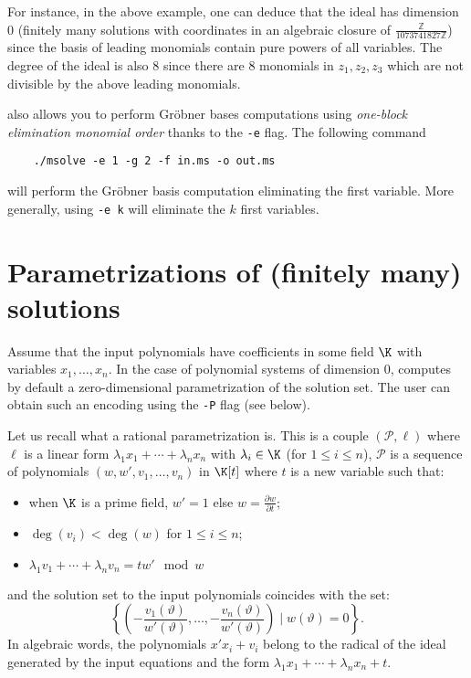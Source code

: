\documentclass[a4paper,english,11pt]{scrartcl}
\theoremstyle{definition}
\theoremstyle{remark}
\def\leq{\leqslant}
\begin{document}
For instance, in the above example, one can deduce that the ideal has dimension
$0$ (finitely many solutions with coordinates in an algebraic closure of
$\frac{\mathbb{Z}}{1073741827\mathbb{Z}}$) since the basis of leading monomials
contain pure powers of all variables. The degree of the ideal is also $8$ since
there are $8$ monomials in $z_1, z_2, z_3$ which are not divisible by the above
leading monomials.

\msolve also allows you to perform Gröbner bases computations using 
\emph{one-block elimination monomial order}
thanks to the \verb+-e+ flag. The following command 
\begin{tcolorbox}
  \begin{lstlisting}
    ./msolve -e 1 -g 2 -f in.ms -o out.ms
  \end{lstlisting}
\end{tcolorbox}
will perform the Gröbner basis computation eliminating the first variable. 
More generally, using \verb+-e k+ will eliminate the $k$ first variables. 


\section{Parametrizations of (finitely many) solutions}\label{sec:param}

Assume that the input polynomials have coefficients in some field $\K$ with
variables $x_1, \ldots, x_n$. In the case of polynomial systems of dimension
$0$, \msolve computes by default a zero-dimensional parametrization of the
solution set. The user can obtain such an encoding using the \verb+-P+ flag 
(see below).

Let us recall what a rational parametrization is.
This is a couple $(\mathscr{P}, \ell)$ where $\ell$ is a linear form $\lambda_1
x_1 + \cdots + \lambda_n x_n$ with $\lambda_i\in \K$ (for $1\leq i \leq n$),
$\mathscr{P}$ is a sequence of polynomials $(w, w', v_1, \ldots, v_n)$ in
$\K[t]$ where $t$ is a new variable such that:
\begin{itemize}
\item when $\K$ is a prime field, $w'=1$ else $w = \frac{\partial w}{\partial
    t}$;
\item $\deg(v_i) < \deg(w)$ for $1\leq i \leq n$;
\item $\lambda_1 v_1 +\cdots +\lambda_n v_n = tw' \mod w$
\end{itemize}
and the solution set to the input polynomials coincides with the set:
\[
\left \{\left (-\frac{v_1(\vartheta)}{w'(\vartheta)}, \ldots,
  -\frac{v_n(\vartheta)}{w'(\vartheta)}\right ) \mid w(\vartheta) = 0
\right\}.
\]
In algebraic words, the polynomials \(x' x_i + v_i\) belong to the radical of the 
ideal generated by the input equations and the form \(\lambda_1 x_1 + \cdots +
\lambda_n x_n + t\). 
\end{document}

